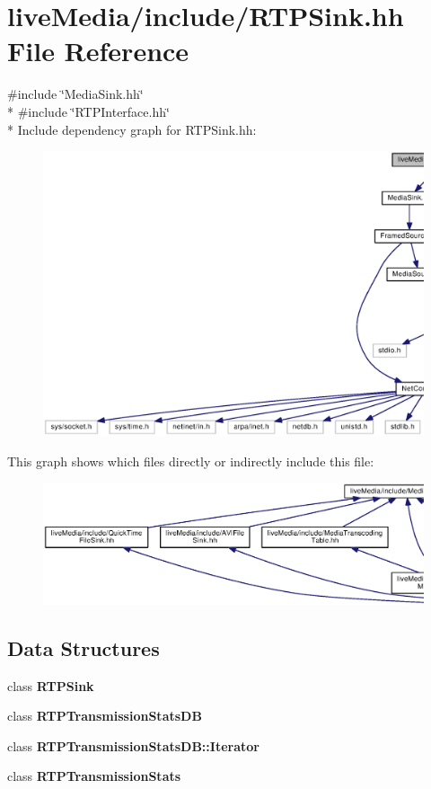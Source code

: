 \section{live\+Media/include/\+R\+T\+P\+Sink.hh File Reference}
\label{RTPSink_8hh}
{\ttfamily \#include \char`\"{}Media\+Sink.\+hh\char`\"{}}\\*
{\ttfamily \#include \char`\"{}R\+T\+P\+Interface.\+hh\char`\"{}}\\*
Include dependency graph for R\+T\+P\+Sink.\+hh\+:
\nopagebreak
\begin{figure}[H]
\begin{center}
\leavevmode
\includegraphics[width=350pt]{RTPSink_8hh__incl}
\end{center}
\end{figure}
This graph shows which files directly or indirectly include this file\+:
\nopagebreak
\begin{figure}[H]
\begin{center}
\leavevmode
\includegraphics[width=350pt]{RTPSink_8hh__dep__incl}
\end{center}
\end{figure}
\subsection*{Data Structures}
\begin{DoxyCompactItemize}
\item 
class {\bf R\+T\+P\+Sink}
\item 
class {\bf R\+T\+P\+Transmission\+Stats\+D\+B}
\item 
class {\bf R\+T\+P\+Transmission\+Stats\+D\+B\+::\+Iterator}
\item 
class {\bf R\+T\+P\+Transmission\+Stats}
\end{DoxyCompactItemize}
